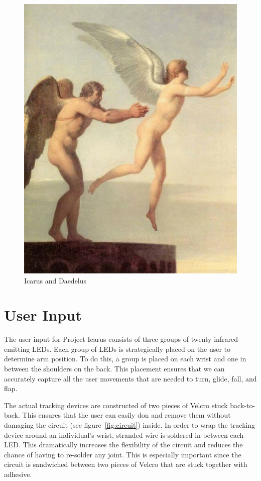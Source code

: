 \documentclass{article}
\begin{document}
\begin{figure}[ht]
\begin{center}
\includegraphics{images/Landon-IcarusandDaedalus.jpg}
\end{center}
\caption{Icarus and Daedelus}
\label{fig:icarus}
\end{figure}


\section{User Input}
The user input for Project Icarus consists of three groups of twenty 
infrared-emitting LEDs.  Each group of LEDs is strategically placed on the user to
determine arm position.  To do this, a group is placed on each wrist and one in
between the shoulders on the back.  This placement ensures that we can
accurately capture all the user movements that are needed to turn, glide, fall,
and flap.

The actual tracking devices are constructed of two pieces of Velcro stuck 
back-to-back.  This ensures that the user can easily don and remove them without
damaging the circuit (see figure~\ref{fig:circuit}) inside.  In order to wrap the tracking device
around an individual's wrist, stranded wire is soldered in between each LED.
This dramatically increases the flexibility of the circuit and reduces the
chance of having to re-solder any joint.  This is especially important since
the circuit is sandwiched between two pieces of Velcro that are stuck together
with adhesive.
\end{document}
